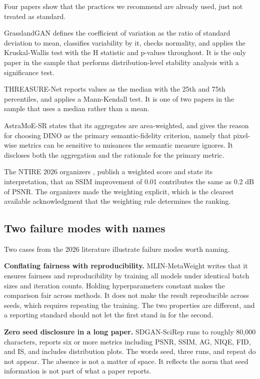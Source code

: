 \documentclass[pdflatex,sn-nature]{sn-jnl}
\begin{document}
Four papers show that the practices we recommend are already used, just not treated as standard.

GrasslandGAN \cite{ref16} defines the coefficient of variation as the ratio of standard deviation to mean, classifies variability by it, checks normality, and applies the Kruskal-Wallis test with the H statistic and p-values throughout. It is the only paper in the sample that performs distribution-level stability analysis with a significance test.

THREASURE-Net \cite{ref17} reports values as the median with the 25th and 75th percentiles, and applies a Mann-Kendall test. It is one of two papers in the sample that uses a median rather than a mean.

AstraMoE-SR \cite{ref14} states that its aggregates are area-weighted, and gives the reason for choosing DINO as the primary semantic-fidelity criterion, namely that pixel-wise metrics can be sensitive to nuisances the semantic measure ignores. It discloses both the aggregation and the rationale for the primary metric.

The NTIRE 2026 organizers \cite{ref4}, \cite{ref5} publish a weighted score and state its interpretation, that an SSIM improvement of 0.01 contributes the same as 0.2 dB of PSNR. The organizers made the weighting explicit, which is the clearest available acknowledgment that the weighting rule determines the ranking.

\subsection{Two failure modes with names}\label{sec:failures}

Two cases from the 2026 literature illustrate failure modes worth naming.

\textbf{Conflating fairness with reproducibility.} MLIN-MetaWeight \cite{ref18} writes that it ensures fairness and reproducibility by training all models under identical batch sizes and iteration counts. Holding hyperparameters constant makes the comparison fair across methods. It does not make the result reproducible across seeds, which requires repeating the training. The two properties are different, and a reporting standard should not let the first stand in for the second.

\textbf{Zero seed disclosure in a long paper.} SDGAN-SciRep \cite{ref19} runs to roughly 80,000 characters, reports six or more metrics including PSNR, SSIM, AG, NIQE, FID, and IS, and includes distribution plots. The words seed, three runs, and repeat do not appear. The absence is not a matter of space. It reflects the norm that seed information is not part of what a paper reports.
\end{document}
